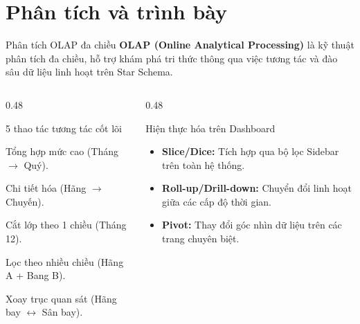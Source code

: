 \section{Phân tích và trình bày}


\begin{frame}{Phân tích OLAP đa chiều}
  \textbf{OLAP (Online Analytical Processing)} là kỹ thuật phân tích đa chiều, hỗ trợ khám phá tri thức thông qua việc tương tác và đào sâu dữ liệu linh hoạt trên Star Schema.

  \vspace{2mm}
  \begin{columns}[T,onlytextwidth]
      \begin{column}{0.48\textwidth}
          \begin{block}{5 thao tác tương tác cốt lõi}
              \begin{description}
                  \item[\textbf{Roll-up}] Tổng hợp mức cao (Tháng $\rightarrow$ Quý).
                  \item[\textbf{Drill-down}] Chi tiết hóa (Hãng $\rightarrow$ Chuyến).
                  \item[\textbf{Slice}] Cắt lớp theo 1 chiều (Tháng 12).
                  \item[\textbf{Dice}] Lọc theo nhiều chiều (Hãng A + Bang B).
                  \item[\textbf{Pivot}] Xoay trục quan sát (Hãng bay $\leftrightarrow$ Sân bay).
              \end{description}
          \end{block}
      \end{column}
      
      \begin{column}{0.48\textwidth}
          \begin{block}{Hiện thực hóa trên Dashboard}
              \begin{itemize}
                  \item \textbf{Slice/Dice:} Tích hợp qua bộ lọc Sidebar trên toàn hệ thống.
                  \item \textbf{Roll-up/Drill-down:} Chuyển đổi linh hoạt giữa các cấp độ thời gian.
                  \item \textbf{Pivot:} Thay đổi góc nhìn dữ liệu trên các trang chuyên biệt.
              \end{itemize}
          \end{block}
      \end{column}
  \end{columns}
\end{frame}

